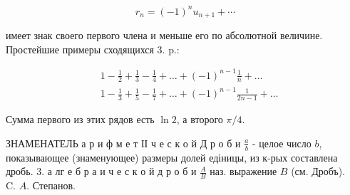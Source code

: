 \documentclass[10pt]{article}
\begin{document}
\[

r_{n}=(-1)^{n} u_{n+1}+\cdots

\]



имеет знак своего первого члена и меньше его по абсолютной величине. Простейшие примеры сходящихся 3. p.:



\[

\begin{aligned}

& 1-\frac{1}{2}+\frac{1}{3}-\frac{1}{4}+\ldots+(-1)^{n-1} \frac{1}{n}+\ldots \\

& 1-\frac{1}{3}+\frac{1}{5}-\frac{1}{7}+\ldots+(-1)^{n-1} \frac{1}{2 n-1}+\ldots

\end{aligned}

\]



Сумма первого из этих рядов есть $\ln 2$, а второго $\pi / 4$.



ЗНАМЕНАТЕЛЬ а р и ф м е т ІІ ч е с к о й Д р о б и $\frac{a}{b}$ - целое число $b$, показывающее (знаменующее) размеры долей едіницы, из к-рых составлена дробь. 3. а лг е б р а и ч е с к о й д р о б и $\frac{A}{B}$ наз. выражение $B$ (см. Дробъ). $\quad$ C. $A$. Степанов.
\end{document}
